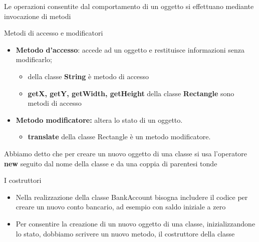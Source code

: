 \begin{frame}
\begin{block}{}
Le operazioni consentite dal comportamento di un oggetto si effettuano mediante invocazione di metodi
\end{block}
\begin{block}{Metodi di accesso e modificatori}
\begin{itemize}
\item \textbf{Metodo d'accesso}: accede ad un oggetto e restituisce informazioni senza modificarlo;
\begin{itemize}
\item {} della classe \textbf{String} è metodo di accesso
\item \textbf{getX, getY, getWidth, getHeight} della classe \textbf{Rectangle} sono metodi di accesso
\end{itemize}
\item \textbf{Metodo modificatore:} \alert{altera lo stato} di un oggetto.
\begin{itemize}
\item \textbf{translate} della classe Rectangle è un metodo modificatore.
\end{itemize}
\end{itemize}
\end{block}
\end{frame}

\begin{frame}
\begin{block}{}
Abbiamo detto che per creare un nuovo oggetto di una classe si usa l’operatore \textbf{new} seguito dal nome della classe e da una coppia di parentesi tonde
\end{block}
\begin{block}{I costruttori}
\begin{itemize}
\item Nella realizzazione della classe BankAccount bisogna includere il codice per creare un nuovo conto bancario, ad 
esempio con saldo iniziale a zero
\item Per consentire la creazione di un nuovo oggetto di una classe, inizializzandone lo stato, dobbiamo
scrivere un nuovo metodo, il \alert{costruttore della classe}
\end{itemize}
\end{block}
\end{frame}

